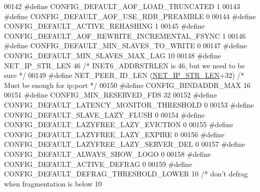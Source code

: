 \begin{DoxyCode}
00142 \textcolor{preprocessor}{#}\textcolor{preprocessor}{define} \textcolor{preprocessor}{CONFIG\_DEFAULT\_AOF\_LOAD\_TRUNCATED} 1
00143 \textcolor{preprocessor}{#}\textcolor{preprocessor}{define} \textcolor{preprocessor}{CONFIG\_DEFAULT\_AOF\_USE\_RDB\_PREAMBLE} 0
00144 \textcolor{preprocessor}{#}\textcolor{preprocessor}{define} \textcolor{preprocessor}{CONFIG\_DEFAULT\_ACTIVE\_REHASHING} 1
00145 \textcolor{preprocessor}{#}\textcolor{preprocessor}{define} \textcolor{preprocessor}{CONFIG\_DEFAULT\_AOF\_REWRITE\_INCREMENTAL\_FSYNC} 1
00146 \textcolor{preprocessor}{#}\textcolor{preprocessor}{define} \textcolor{preprocessor}{CONFIG\_DEFAULT\_MIN\_SLAVES\_TO\_WRITE} 0
00147 \textcolor{preprocessor}{#}\textcolor{preprocessor}{define} \textcolor{preprocessor}{CONFIG\_DEFAULT\_MIN\_SLAVES\_MAX\_LAG} 10
00148 \textcolor{preprocessor}{#}\textcolor{preprocessor}{define} \textcolor{preprocessor}{NET\_IP\_STR\_LEN} 46 \textcolor{comment}{/* INET6\_ADDRSTRLEN is 46, but we need to be sure */}
00149 \textcolor{preprocessor}{#}\textcolor{preprocessor}{define} \textcolor{preprocessor}{NET\_PEER\_ID\_LEN} \textcolor{preprocessor}{(}\hyperlink{server_8h_ad97c5405ed22a94e9fcc10fba577d6c0}{NET\_IP\_STR\_LEN}\textcolor{preprocessor}{+}32\textcolor{preprocessor}{)} \textcolor{comment}{/* Must be enough for ip:port */}
00150 \textcolor{preprocessor}{#}\textcolor{preprocessor}{define} \textcolor{preprocessor}{CONFIG\_BINDADDR\_MAX} 16
00151 \textcolor{preprocessor}{#}\textcolor{preprocessor}{define} \textcolor{preprocessor}{CONFIG\_MIN\_RESERVED\_FDS} 32
00152 \textcolor{preprocessor}{#}\textcolor{preprocessor}{define} \textcolor{preprocessor}{CONFIG\_DEFAULT\_LATENCY\_MONITOR\_THRESHOLD} 0
00153 \textcolor{preprocessor}{#}\textcolor{preprocessor}{define} \textcolor{preprocessor}{CONFIG\_DEFAULT\_SLAVE\_LAZY\_FLUSH} 0
00154 \textcolor{preprocessor}{#}\textcolor{preprocessor}{define} \textcolor{preprocessor}{CONFIG\_DEFAULT\_LAZYFREE\_LAZY\_EVICTION} 0
00155 \textcolor{preprocessor}{#}\textcolor{preprocessor}{define} \textcolor{preprocessor}{CONFIG\_DEFAULT\_LAZYFREE\_LAZY\_EXPIRE} 0
00156 \textcolor{preprocessor}{#}\textcolor{preprocessor}{define} \textcolor{preprocessor}{CONFIG\_DEFAULT\_LAZYFREE\_LAZY\_SERVER\_DEL} 0
00157 \textcolor{preprocessor}{#}\textcolor{preprocessor}{define} \textcolor{preprocessor}{CONFIG\_DEFAULT\_ALWAYS\_SHOW\_LOGO} 0
00158 \textcolor{preprocessor}{#}\textcolor{preprocessor}{define} \textcolor{preprocessor}{CONFIG\_DEFAULT\_ACTIVE\_DEFRAG} 0
00159 \textcolor{preprocessor}{#}\textcolor{preprocessor}{define} \textcolor{preprocessor}{CONFIG\_DEFAULT\_DEFRAG\_THRESHOLD\_LOWER} 10 \textcolor{comment}{/* don't defrag when fragmentation is below 10%
}
\end{DoxyCode}
